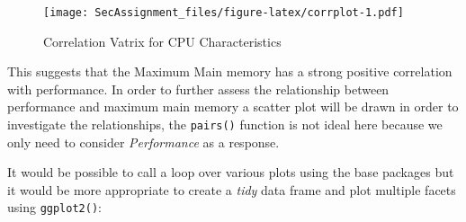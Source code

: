\documentclass[12pt]{article}
\begin{document}
\begin{figure}
\centering
\texttt{[image: SecAssignment\_files/figure-latex/corrplot-1.pdf]}
\caption{Correlation Vatrix for CPU Characteristics}
\end{figure}

This suggests that the Maximum Main memory has a strong positive
correlation with performance. In order to further assess the
relationship between performance and maximum main memory a scatter plot
will be drawn in order to investigate the relationships, the
\texttt{pairs()} function is not ideal here because we only need to
consider \emph{Performance} as a response.

It would be possible to call a loop over various plots using the base
packages but it would be more appropriate to create a \emph{tidy} data
frame and plot multiple facets using \texttt{ggplot2()}:
\end{document}
